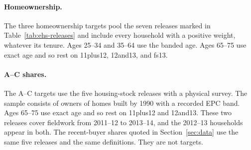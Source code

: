 \paragraph{Homeownership.} The three homeownership targets pool the seven
releases marked in Table~\ref{tab:ehs-releases} and include every household
with a positive weight, whatever its tenure. Ages 25--34 and 35--64 use the
banded age. Ages 65--75 use exact age and so rest on 11plus12, 12and13, and
fs13.

\paragraph{A--C shares.} The A--C targets use the five housing-stock releases
with a physical survey. The sample consists of owners of homes built by 1990
with a recorded EPC band. Ages 65--75 use exact age and so rest on 11plus12
and 12and13. These two releases cover fieldwork from 2011--12 to
2013--14, and the 2012--13 households appear in both. The recent-buyer shares
quoted in Section~\ref{sec:data} use the same five releases and the
same definitions. They are not targets.


